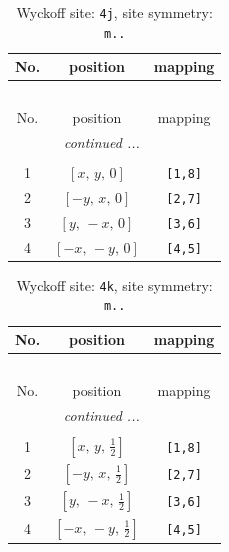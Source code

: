 \documentclass[fleqn,8pt]{jsarticle}
\begin{document}
\begin{longtable}{ccc}
\caption{Wyckoff site: {\tt 4j}, site symmetry: {\tt m..}}
 \\
 \hline \hline
No. & position & mapping \\ \hline \endfirsthead

\multicolumn{2}{l}{\tablename\ \thetable{}} \\
 \hline \hline
No. & position & mapping \\ \hline \endhead

 \hline \hline
\multicolumn{2}{r}{\footnotesize\it continued ...} \\ \endfoot

 \hline \hline
\multicolumn{2}{r}{} \\ \endlastfoot

1 & $\left[ x,\, y,\, 0 \right]$ & {\tt [1,8]} \\ \hline
2 & $\left[ - y,\, x,\, 0 \right]$ & {\tt [2,7]} \\ \hline
3 & $\left[ y,\, - x,\, 0 \right]$ & {\tt [3,6]} \\ \hline
4 & $\left[ - x,\, - y,\, 0 \right]$ & {\tt [4,5]} \\
\end{longtable}
\renewcommand{\arraystretch}{1.2}
\begin{longtable}{ccc}
\caption{Wyckoff site: {\tt 4k}, site symmetry: {\tt m..}}
 \\
 \hline \hline
No. & position & mapping \\ \hline \endfirsthead

\multicolumn{2}{l}{\tablename\ \thetable{}} \\
 \hline \hline
No. & position & mapping \\ \hline \endhead

 \hline \hline
\multicolumn{2}{r}{\footnotesize\it continued ...} \\ \endfoot

 \hline \hline
\multicolumn{2}{r}{} \\ \endlastfoot

1 & $\left[ x,\, y,\, \frac{1}{2} \right]$ & {\tt [1,8]} \\ \hline
2 & $\left[ - y,\, x,\, \frac{1}{2} \right]$ & {\tt [2,7]} \\ \hline
3 & $\left[ y,\, - x,\, \frac{1}{2} \right]$ & {\tt [3,6]} \\ \hline
4 & $\left[ - x,\, - y,\, \frac{1}{2} \right]$ & {\tt [4,5]} \\
\end{longtable}
\end{document}
